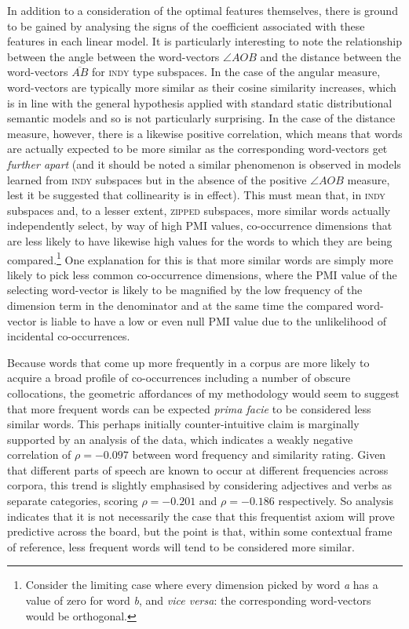 In addition to a consideration of the optimal features themselves, there is ground to be gained by analysing the signs of the coefficient associated with these features in each linear model.  It is particularly interesting to note the relationship between the angle between the word-vectors $\angle AOB$ and the distance between the word-vectors $\overline{AB}$ for \textsc{indy} type subspaces.  In the case of the angular measure, word-vectors are typically more similar as their cosine similarity increases, which is in line with the general hypothesis applied with standard static distributional semantic models and so is not particularly surprising.  In the case of the distance measure, however, there is a likewise positive correlation, which means that words are actually expected to be more similar as the corresponding word-vectors get \emph{further apart} (and it should be noted a similar phenomenon is observed in models learned from \textsc{indy} subspaces but in the absence of the positive $\angle AOB$ measure, lest it be suggested that collinearity is in effect).  This must mean that, in \textsc{indy} subspaces and, to a lesser extent, \textsc{zipped} subspaces, more similar words actually independently select, by way of high PMI values, co-occurrence dimensions that are less likely to have likewise high values for the words to which they are being compared.\footnote{Consider the limiting case where every dimension picked by word \emph{a} has a value of zero for word \emph{b}, and \emph{vice versa}: the corresponding word-vectors would be orthogonal.}  One explanation for this is that more similar words are simply more likely to pick less common co-occurrence dimensions, where the PMI value of the selecting word-vector is likely to be magnified by the low frequency of the dimension term in the denominator and at the same time the compared word-vector is liable to have a low or even null PMI value due to the unlikelihood of incidental co-occurrences.

Because words that come up more frequently in a corpus are more likely to acquire a broad profile of co-occurrences including a number of obscure collocations, the geometric affordances of my methodology would seem to suggest that more frequent words can be expected \emph{prima facie} to be considered less similar words.  This perhaps initially counter-intuitive claim is marginally supported by an analysis of the data, which indicates a weakly negative correlation of $\rho = -0.097$ between word frequency and similarity rating.  Given that different parts of speech are known to occur at different frequencies across corpora, this trend is slightly emphasised by considering adjectives and verbs as separate categories, scoring $\rho = -0.201$ and $\rho = -0.186$ respectively.  So analysis indicates that it is not necessarily the case that this frequentist axiom will prove predictive across the board, but the point is that, within some contextual frame of reference, less frequent words will tend to be considered more similar.


